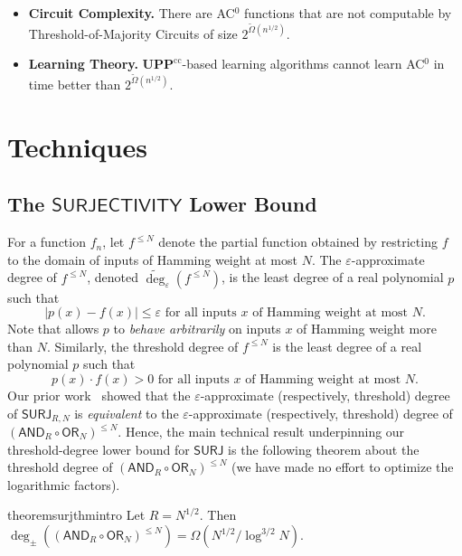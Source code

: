 \documentclass{toc}
\newcommand{\SURJ}{\mathsf{ SURJ}}
\newcommand{\OR}{\mathsf{ OR}}
\newcommand{\UPP}{\mathbf{UPP}}
\newcommand{\eps}{\varepsilon}
\newcommand{\adeg}{\widetilde{\operatorname{deg}}}
\newcommand{\AND}{\mathsf{AND}}
\begin{document}
\begin{itemize}
	\item \textbf{Circuit Complexity.} There are AC$^0$ functions that are not computable by Threshold-of-Majority Circuits of size $2^{\tilde{\Omega}(n^{1/2})}$.
	
	\item \textbf{Learning Theory.}  $\UPP^{\text{cc}}$-based learning algorithms cannot learn AC$^0$
	in time better than $2^{\tilde{\Omega}(n^{1/2})}$. 
\end{itemize}



\vspace{-4mm}
\section{Techniques} 
\subsection{The \texorpdfstring{$\mathsf{SURJECTIVITY}$}{SURJECTIVITY}
     Lower Bound}
\label{s:surjoverview}
For a function $f_n$, let $f^{\leq N}$ denote the partial function obtained by
restricting $f$ to the domain of inputs of Hamming weight at most $N$. 
The $\eps$-approximate degree of $f^{\leq N}$, denoted $\adeg_{\eps}(f^{\leq N})$, is the least degree of a 
real polynomial $p$ such that 
\begin{equation} \label{dupy} |p(x)-f(x)| \leq \eps \text{ for all inputs } x \text{ of Hamming weight at most } N. \end{equation}
Note that  allows $p$ to \emph{behave arbitrarily} on inputs $x$ of Hamming weight more than $N$.
Similarly, the threshold degree of $f^{\leq N}$ is the least degree of a 
real polynomial $p$ such that 
\begin{equation*} p(x) \cdot f(x) > 0 \text{ for all inputs } x \text{ of Hamming weight at most } N. \end{equation*}
Our prior work~\cite{adegsurj} showed that the $\eps$-approximate (respectively, threshold) degree of $\SURJ_{R, N}$
is \emph{equivalent} to the $\eps$-approximate (respectively, threshold) degree of $(\AND_R \circ \OR_N)^{\leq N}$.
Hence, the main technical result underpinning our 
threshold-degree %
lower bound for $\SURJ$
is the following theorem about the threshold degree of $(\AND_R \circ \OR_N)^{\leq N}$ (we have made no effort to optimize the logarithmic factors).

\begin{restatable}{theorem}{surjthmintro}
	\label{surjthmintro} \label{surjthm}
	Let $R=N^{1/2}$. Then $\deg_{\pm}\left(\left(\AND_R \circ \OR_N\right)^{\leq N}\right) = \Omega(N^{1/2}/\log^{3/2} N)$.
\end{restatable}
\end{document}
